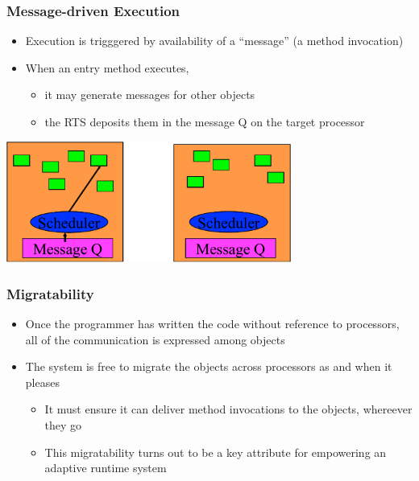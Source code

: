 \begin{frame}[t]
\frametitle{Message-driven Execution}
  \begin{itemize}
    \item Execution is trigggered by availability of a ``message'' (a method invocation)
    \pause
    \item When an entry method executes, 
    \begin{itemize}
      \item it may generate messages for other objects
      \item the RTS deposits them in the message Q on the target processor
    \end{itemize}
  \end{itemize}
  \begin{center} \includegraphics[width=0.7\textwidth]{figures/scheduler} \end{center}
\end{frame}

\begin{frame}[t]
\frametitle{Migratability}
  \begin{itemize}
    \item Once the programmer has written the code without reference to
        processors, all of the communication is expressed among objects
    \item The system is free to migrate the objects across processors as and when it pleases
      \begin{itemize}
        \item It must ensure it can deliver method invocations to the objects, whereever they go
        \item This migratability turns out to be a key attribute for empowering an adaptive runtime system
      \end{itemize}
  \end{itemize}
\end{frame}
